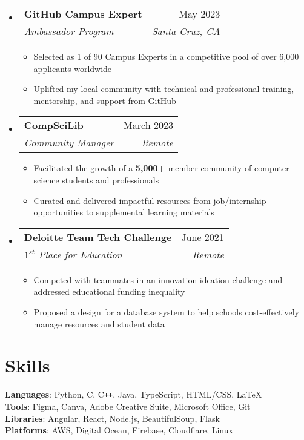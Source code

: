 \documentclass[letterpaper,11pt]{article}
\makeatletter
\newcommand{\resumeItem}[1]{
  \item\small{
    {#1 \vspace{-2pt}}
  }
}
\newcommand{\resumeSubheading}[4]{
  \vspace{-2pt}\item
    \begin{tabular*}{0.97\textwidth}[t]{l@{\extracolsep{\fill}}r}
      \textbf{#1} & #2 \\
      \textit{\small#3} & \textit{\small #4} \\
    \end{tabular*}\vspace{-7pt}
}
\newcommand{\resumeSubHeadingListStart}{\begin{itemize}[leftmargin=0.15in, label={}]}
\newcommand{\resumeSubHeadingListEnd}{\end{itemize}}
\newcommand{\resumeItemListStart}{\begin{itemize}}
\newcommand{\resumeItemListEnd}{\end{itemize}\vspace{-5pt}}
\makeatother
\begin{document}
\resumeSubHeadingListStart

\resumeSubheading{GitHub Campus Expert}{May 2023}{Ambassador Program}{Santa Cruz, CA}
\resumeItemListStart
\resumeItem{Selected as 1 of 90 Campus Experts in a competitive pool of over 6,000 applicants worldwide}
\resumeItem{Uplifted my local community with technical and professional training, mentorship, and support from GitHub}
\resumeItemListEnd

\resumeSubheading{CompSciLib}{March 2023}{Community Manager}{Remote}
\resumeItemListStart
\resumeItem{Facilitated the growth of a \textbf{5,000+} member community of computer science students and professionals}
\resumeItem{Curated and delivered impactful resources from job/internship opportunities to supplemental learning materials}
\resumeItemListEnd

\resumeSubheading{Deloitte Team Tech Challenge}{June 2021}{$1^{st}$ Place for Education}{Remote}
\resumeItemListStart
\resumeItem{Competed with teammates in an innovation ideation challenge and addressed educational funding inequality}
\resumeItem{Proposed a design for a database system to help schools cost-effectively manage resources and student data}
\resumeItemListEnd

\resumeSubHeadingListEnd
\vspace{-10pt}

\section{Skills}
\begin{itemize}[leftmargin=0.15in, label={}]
  \small{\item{
                \textbf{Languages}{: Python, C, C\texttt{++}, Java, TypeScript, HTML/CSS, \LaTeX} \\
                \textbf{Tools}{: Figma, Canva, Adobe Creative Suite, Microsoft Office, Git} \\
                \textbf{Libraries}{: Angular, React, Node.js, BeautifulSoup, Flask} \\
                \textbf{Platforms}{: AWS, Digital Ocean, Firebase, Cloudflare, Linux} \\
          }}
\end{itemize}
\end{document}
